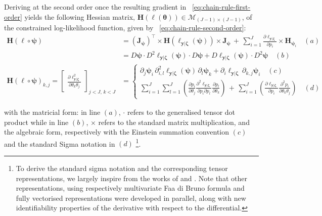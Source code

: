 \documentclass[long, final]{jobim}
\begin{document}
Deriving at the second order once the resulting gradient in \equationname~\ref{eq:chain-rule-first-order} yields the following Hessian matrix, $\mathbf{H}(\ell (\boldsymbol{\theta})) \in \mathcal{M}_{(J-1)\times(J-1)}$, of the constrained log-likelihood function, given by \equationname~\ref{eq:chain-rule-second-order}:
\begin{equation}
     \label{eq:chain-rule-second-order}
\begin{aligned}
    \mathbf{H} (\ell \circ \boldsymbol{\psi}) &= \left(\mathbf{J}_{\boldsymbol{\psi}}\right)^\top \times \mathbf{H} (\ell_{\boldsymbol{y}|\boldsymbol{\zeta}} (\boldsymbol{\psi})) \times \mathbf{J}_{\boldsymbol{\psi}} \, + \, \sum_{i=1}^J \frac{\partial \ell_{\boldsymbol{y}|\boldsymbol{\zeta}}}{\partial p_i} \times     \mathbf{H}_ {\boldsymbol{\psi}_i} \quad (a)\\
 &=   D \boldsymbol{\psi} \cdot  D^2 \ell_{\boldsymbol{y}|\boldsymbol{\zeta}} (\boldsymbol{\psi})  \cdot D\boldsymbol{\psi} + D \ell_{\boldsymbol{y}|\boldsymbol{\zeta}} (\boldsymbol{\psi}) \cdot D^2 \boldsymbol{\psi} \quad (b) \\
\mathbf{H} (\ell \circ \boldsymbol{\psi})_{k, j} =
 \begin{bmatrix}   
   \frac{\partial \ell_{\boldsymbol{y}|\boldsymbol{\zeta}}^2 }{\partial \theta_k \theta_j} 
  \end{bmatrix}_{j < J, \, k < J}  & = 
  \begin{cases}
 \partial_j \boldsymbol{\psi}_i \, \partial^2_{i, l} \ell_{\boldsymbol{y}|\boldsymbol{\zeta}} (\boldsymbol{\psi}) \, \partial_l \boldsymbol{\psi}_k + \partial_i \ell_{\boldsymbol{y}|\boldsymbol{\zeta}} \, \partial_{k,j} \boldsymbol{\psi}_i \quad (c) \\
  \sum_{i=1}^J \sum_{l=1}^J \left(  \frac{\partial p_i }{\partial \theta_j} \frac{\partial^2 \ell_{\boldsymbol{y}|\boldsymbol{\zeta}} }{\partial p_i \partial p_l} \frac{\partial p_l }{\partial \theta_k}\right)  \, + \,  \sum_{i=1}^J  \left( \frac{\partial \ell_{\boldsymbol{y}|\boldsymbol{\zeta}} }{\partial p_i} \frac{\partial^2 p_i }{\partial \theta_k \theta_j}\right) \quad (d) 
  \end{cases}
  \end{aligned}
\end{equation}

with the matricial form: in line $(a)$, $\cdot$ refers to the generalised tensor dot product while in line $(b)$, $\times$ refers to the standard matrix multiplication, and the algebraic form, respectively with the Einstein summation convention $(c)$ and the standard Sigma notation in $(d)$ \footnote{To derive the standard sigma notation and the corresponding tensor representations, we largely inspire from the works of \cite{hardy06} and \cite{skorski19}. Note that other representations, using respectively multivariate Faa di Bruno formula \citep{constantine_savits96} and fully vectorised representations \citep{chacon_duong20} were developed in parallel, along with new identifiability properties of the derivative with respect to the differential.}.
\end{document}
